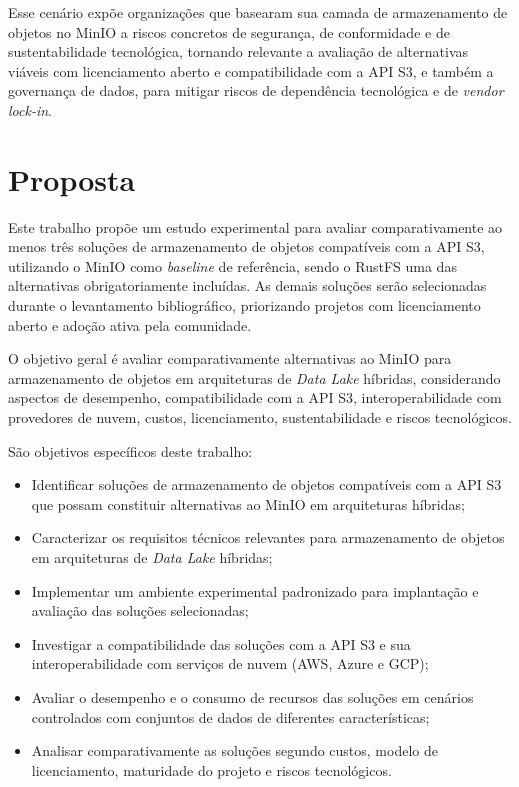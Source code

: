 \documentclass[bacharelado]{pre-projeto-computacao}
\begin{document}
Esse cenário expõe organizações que basearam sua camada de armazenamento de objetos
no MinIO a riscos concretos de segurança, de conformidade e de sustentabilidade
tecnológica, tornando relevante a avaliação de alternativas viáveis com licenciamento
aberto e compatibilidade com a API S3, e também a governança de dados, para mitigar
riscos de dependência tecnológica e de \textit{vendor lock-in}.


\section*{Proposta}

Este trabalho propõe um estudo experimental para avaliar comparativamente ao menos
três soluções de armazenamento de objetos compatíveis com a API S3, utilizando o
MinIO como \textit{baseline} de referência, sendo o RustFS uma das alternativas
obrigatoriamente incluídas. As demais soluções serão selecionadas durante o
levantamento bibliográfico, priorizando projetos com licenciamento aberto e
adoção ativa pela comunidade.

O objetivo geral é avaliar comparativamente alternativas ao MinIO para
armazenamento de objetos em arquiteturas de \textit{Data Lake} híbridas,
considerando aspectos de desempenho, compatibilidade com a API S3,
interoperabilidade com provedores de nuvem, custos, licenciamento,
sustentabilidade e riscos tecnológicos.

São objetivos específicos deste trabalho:

\begin{itemize}
    \item Identificar soluções de armazenamento de objetos compatíveis com a
          API S3 que possam constituir alternativas ao MinIO em arquiteturas
          híbridas;
    \item Caracterizar os requisitos técnicos relevantes para armazenamento de
          objetos em arquiteturas de \textit{Data Lake} híbridas;
    \item Implementar um ambiente experimental padronizado para implantação e
          avaliação das soluções selecionadas;
    \item Investigar a compatibilidade das soluções com a API S3 e sua
          interoperabilidade com serviços de nuvem (AWS, Azure e GCP);
    \item Avaliar o desempenho e o consumo de recursos das soluções em cenários
          controlados com conjuntos de dados de diferentes características;
    \item Analisar comparativamente as soluções segundo custos, modelo de
          licenciamento, maturidade do projeto e riscos tecnológicos.
\end{itemize}
\end{document}
